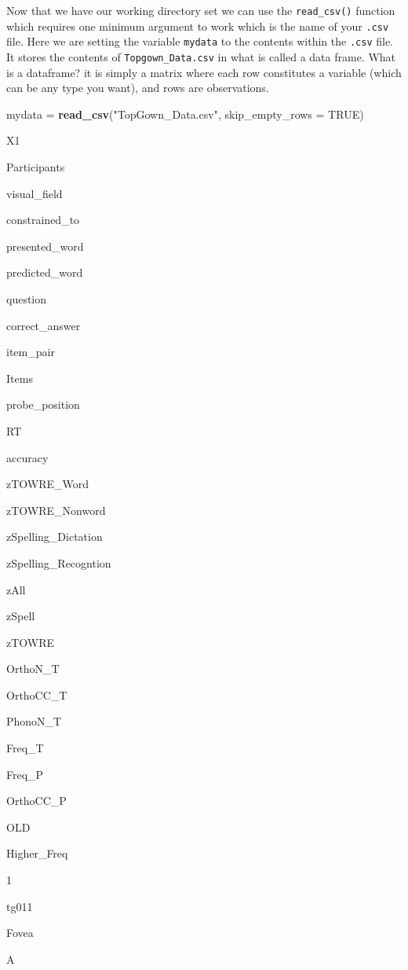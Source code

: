 \documentclass[]{book}
\newenvironment{Shaded}{\begin{snugshade}}{\end{snugshade}}
\newcommand{\KeywordTok}[1]{\textcolor[rgb]{0.13,0.29,0.53}{\textbf{#1}}}
\newcommand{\DataTypeTok}[1]{\textcolor[rgb]{0.13,0.29,0.53}{#1}}
\newcommand{\StringTok}[1]{\textcolor[rgb]{0.31,0.60,0.02}{#1}}
\newcommand{\OtherTok}[1]{\textcolor[rgb]{0.56,0.35,0.01}{#1}}
\newcommand{\NormalTok}[1]{#1}
\begin{document}
Now that we have our working directory set we can use the
\texttt{read\_csv()} function which requires one minimum argument to
work which is the name of your \texttt{.csv} file. Here we are setting
the variable \texttt{mydata} to the contents within the \texttt{.csv}
file. It stores the contents of \texttt{Topgown\_Data.csv} in what is
called a data frame. What is a dataframe? it is simply a matrix where
each row constitutes a variable (which can be any type you want), and
rows are observations.

\begin{Shaded}
\begin{Highlighting}[]
\NormalTok{mydata =}\StringTok{ }\KeywordTok{read_csv}\NormalTok{(}\StringTok{"TopGown_Data.csv"}\NormalTok{, }\DataTypeTok{skip_empty_rows =} \OtherTok{TRUE}\NormalTok{)}
\end{Highlighting}
\end{Shaded}

X1

Participants

visual\_field

constrained\_to

presented\_word

predicted\_word

question

correct\_answer

item\_pair

Items

probe\_position

RT

accuracy

zTOWRE\_Word

zTOWRE\_Nonword

zSpelling\_Dictation

zSpelling\_Recogntion

zAll

zSpell

zTOWRE

OrthoN\_T

OrthoCC\_T

PhonoN\_T

Freq\_T

Freq\_P

OrthoCC\_P

OLD

Higher\_Freq

1

tg011

Fovea

A
\end{document}
